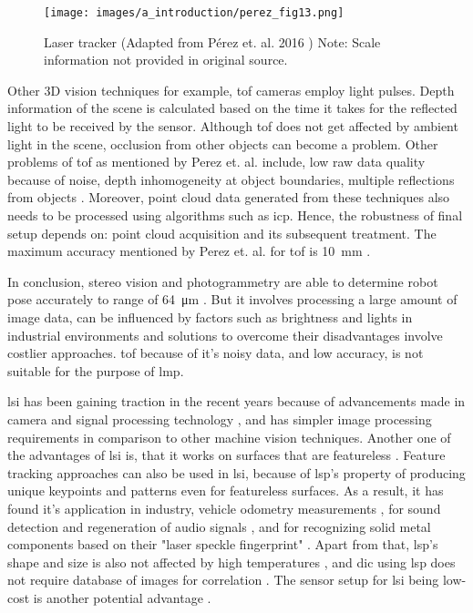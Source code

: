     \vspace{5mm}
    \begin{figure}[h]
        \centering
        \texttt{[image: images/a\_introduction/perez\_fig13.png]}
        \caption{Laser tracker (Adapted from Pérez et. al. 2016 \cite{perez}) Note: Scale information not provided in original source.}
        \label{fig:perez_fig13}
    \end{figure}
    \vspace{5mm}
    
    \noindent Other 3D vision techniques for example, \gls{tof} cameras employ light pulses. Depth information of the scene is calculated based on the time it takes for the reflected light to be received by the sensor. Although \gls{tof} does not get affected by ambient light in the scene, occlusion from other objects can become a problem. Other problems of \gls{tof} as mentioned by Perez et. al. include, low raw data quality because of noise, depth inhomogeneity at object boundaries, multiple reflections from objects \cite{perez}. Moreover, point cloud data generated from these techniques also needs to be processed using algorithms such as \gls{icp}. Hence, the robustness of final setup depends on: point cloud acquisition and its subsequent treatment. The maximum accuracy mentioned by Perez et. al. for \gls{tof} is \SI{10}{\milli\meter} \cite{perez}.
    
    \vspace{5mm}
    \noindent In conclusion, stereo vision and photogrammetry are able to determine robot pose accurately to range of \SI{64}{\micro\meter} \cite{perez}. But it involves processing a large amount of image data, can be influenced by factors such as brightness and lights in industrial environments and solutions to overcome their disadvantages involve costlier approaches. \gls{tof} because of it's noisy data, and low accuracy, is not suitable for the purpose of \gls{lmp}.

    \vspace{5mm}

    \noindent \gls{lsi} has been gaining traction in the recent years because of advancements made in camera and signal processing technology \cite{filter, farsad}, and has simpler image processing requirements in comparison to other machine vision techniques. Another one of the advantages of \gls{lsi} is, that it works on surfaces that are featureless \cite{francis_autonomous}. Feature tracking approaches can also be used in \gls{lsi}, because of \gls{lsp}'s property of producing unique keypoints and patterns even for featureless surfaces. As a result, it has found it's application in industry, vehicle odometry measurements \cite{charrett_mars}, for sound detection and regeneration of audio signals \cite{nan_wu}, and for recognizing solid metal components based on their "laser speckle fingerprint" \cite{sjoedahl}. Apart from that, \gls{lsp}'s shape and size is also not affected by high temperatures \cite{song}, and \gls{dic} using \gls{lsp} does not require database of images for correlation \cite{farsad}. The sensor setup for \gls{lsi} being low-cost is another potential advantage \cite{charrett_2018}.


